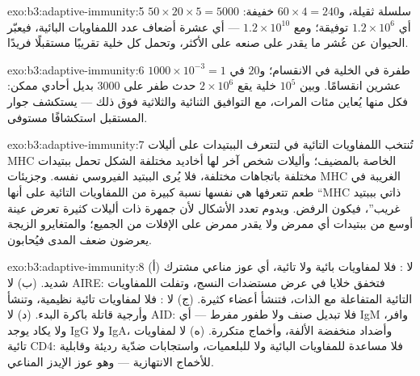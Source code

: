 \begin{solution}{exo:b3:adaptive-immunity:5}
$50\times 20\times 5 = 5000$ سلسلة ثقيلة، و$60\times 4 = 240$ خفيفة:
أي $1.2\times 10^{6}$ توفيقة؛ ومع  $1.2\times
10^{10}$ --- أي عشرة أضعاف عدد اللمفاويات البائية، فيعبّر
الحيوان عن عُشر ما يقدر على صنعه على الأكثر، وتحمل كل خلية
تقريبًا مستقبلًا فريدًا.
\end{solution}

\begin{solution}{exo:b3:adaptive-immunity:6}
$1000\times 10^{-3} = 1$ طفرة في الخلية في الانقسام؛ و$20$ في
عشرين انقسامًا. وبين $10^{5}$ خلية يقع $2\times 10^{6}$ حدث
طفر على $3000$ بديل أحادي ممكن: فكل منها يُعاين مئات المرات،
مع التوافيق الثنائية والثلاثية فوق ذلك --- 
يستكشف جوار المستقبل استكشافًا مستوفى.
\end{solution}

\begin{solution}{exo:b3:adaptive-immunity:7}
تُنتخب اللمفاويات التائية في  لتتعرف الببتيدات على
أليلات MHC الخاصة بالمضيف؛ وأليلات شخص آخر لها أخاديد مختلفة
الشكل تحمل ببتيدات مختلفة باتجاهات مختلفة، فلا يُرى الببتيد
الفيروسي نفسه. وجزيئات MHC الغريبة في طعم تتعرفها هي نفسها
نسبة كبيرة من اللمفاويات التائية على أنها ``MHC ذاتي بببتيد
غريب''، فيكون الرفض. ويدوم تعدد الأشكال لأن جمهرة ذات
أليلات كثيرة تعرض عينة أوسع من ببتيدات أي ممرض ولا يقدر
ممرض على الإفلات من الجميع؛ والمتغايرو الزيجة يعرضون ضعف
المدى فيُحابون.
\end{solution}

\begin{solution}{exo:b3:adaptive-immunity:8}
(أ) لا : فلا لمفاويات بائية ولا تائية، أي
عوز مناعي مشترك شديد. (ب) لا AIRE: فتخفق خلايا  في
عرض مستضدات النسج، وتفلت اللمفاويات التائية المتفاعلة مع
الذات، فتنشأ   أعضاء كثيرة. (ج) لا : فلا
لمفاويات تائية نظيمية، وتنشأ  وأرجية قاتلة باكرة
البدء. (د) لا AID: فلا تبديل صنف ولا طفور مفرط --- أي IgM
وافر، ولا يكاد يوجد IgG ولا IgA، وأضداد منخفضة الألفة،
وأخماج متكررة. (ه) لا لمفاويات تائية CD4: فلا مساعدة
للمفاويات البائية ولا للبلعميات، واستجابات ضدّية رديئة
وقابلية للأخماج الانتهازية --- وهو عوز الإيدز المناعي.
\end{solution}

